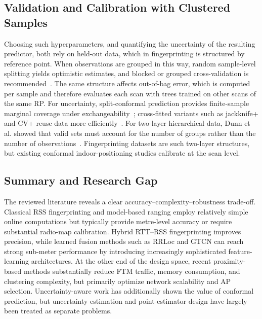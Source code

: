 \subsection{Validation and Calibration with Clustered Samples}
\label{subsec:rw_clustered}

Choosing such hyperparameters, and quantifying the uncertainty of the resulting predictor, both rely on held-out data, which in fingerprinting is structured by reference point. When observations are grouped in this way, random sample-level splitting yields optimistic estimates, and blocked or grouped cross-validation is recommended~\cite{roberts2017crossvalidation}. The same structure affects out-of-bag error, which is computed per sample and therefore evaluates each scan with trees trained on other scans of the same RP. For uncertainty, split-conformal prediction provides finite-sample marginal coverage under exchangeability~\cite{lei2018distribution}; cross-fitted variants such as jackknife+ and CV+ reuse data more efficiently~\cite{barber2021jackknife}. For two-layer hierarchical data, Dunn et al. showed that valid sets must account for the number of groups rather than the number of observations~\cite{Dunn02102023}. Fingerprinting datasets are such two-layer structures, but existing conformal indoor-positioning studies calibrate at the scan level.

\subsection{Summary and Research Gap}
\label{subsec:rw_gap}

The reviewed literature reveals a clear accuracy--complexity--robustness trade-off. Classical RSS fingerprinting and model-based ranging employ relatively simple online computations but typically provide metre-level accuracy or require substantial radio-map calibration. Hybrid RTT--RSS fingerprinting improves precision, while learned fusion methods such as RRLoc and GTCN can reach strong sub-meter performance by introducing increasingly sophisticated feature-learning architectures. At the other end of the design space, recent proximity-based methods substantially reduce FTM traffic, memory consumption, and clustering complexity, but primarily optimize network scalability and AP selection. Uncertainty-aware work has additionally shown the value of conformal prediction, but uncertainty estimation and point-estimator design have largely been treated as separate problems.

